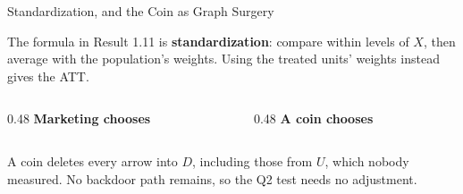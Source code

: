 \documentclass[aspectratio=169, 11pt, handout]{beamer}
\begin{document}
\begin{frame}{Standardization, and the Coin as Graph Surgery}

The formula in Result 1.11 is \textbf{standardization}: compare within levels of $X$, then average with the population's weights. Using the treated units' weights instead gives the ATT.

\bigskip

\begin{columns}[T]
\begin{column}{0.48\textwidth}
\centering
\textbf{Marketing chooses}\\[0.5em]
\end{column}
\begin{column}{0.48\textwidth}
\centering
\textbf{A coin chooses}\\[0.5em]
\end{column}
\end{columns}

\bigskip

A coin deletes every arrow into $D$, including those from $U$, which nobody measured. No backdoor path remains, so the Q2 test needs no adjustment.
\end{frame}
\end{document}
